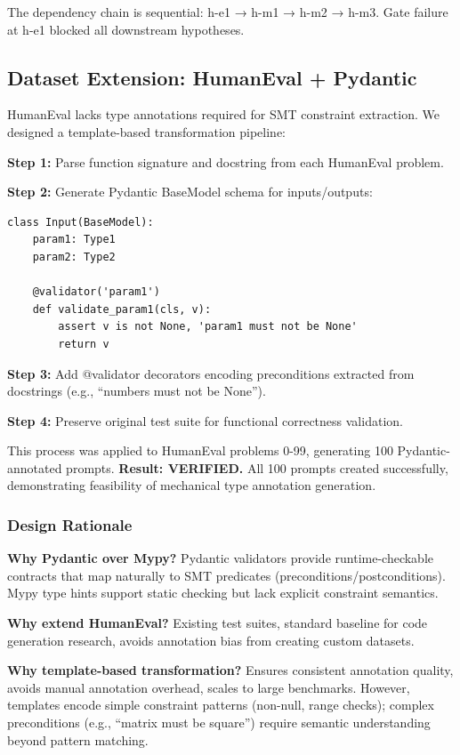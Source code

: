 The dependency chain is sequential: h-e1 → h-m1 → h-m2 → h-m3. Gate failure at h-e1 blocked all downstream hypotheses.

\subsection{Dataset Extension: HumanEval + Pydantic}

HumanEval lacks type annotations required for SMT constraint extraction. We designed a template-based transformation pipeline:

\textbf{Step 1:} Parse function signature and docstring from each HumanEval problem.

\textbf{Step 2:} Generate Pydantic BaseModel schema for inputs/outputs:
\begin{verbatim}
class Input(BaseModel):
    param1: Type1
    param2: Type2

    @validator('param1')
    def validate_param1(cls, v):
        assert v is not None, 'param1 must not be None'
        return v
\end{verbatim}

\textbf{Step 3:} Add @validator decorators encoding preconditions extracted from docstrings (e.g., ``numbers must not be None'').

\textbf{Step 4:} Preserve original test suite for functional correctness validation.

This process was applied to HumanEval problems 0-99, generating 100 Pydantic-annotated prompts. \textbf{Result: VERIFIED.} All 100 prompts created successfully, demonstrating feasibility of mechanical type annotation generation.

\subsubsection{Design Rationale}

\textbf{Why Pydantic over Mypy?} Pydantic validators provide runtime-checkable contracts that map naturally to SMT predicates (preconditions/postconditions). Mypy type hints support static checking but lack explicit constraint semantics.

\textbf{Why extend HumanEval?} Existing test suites, standard baseline for code generation research, avoids annotation bias from creating custom datasets.

\textbf{Why template-based transformation?} Ensures consistent annotation quality, avoids manual annotation overhead, scales to large benchmarks. However, templates encode simple constraint patterns (non-null, range checks); complex preconditions (e.g., ``matrix must be square'') require semantic understanding beyond pattern matching.

